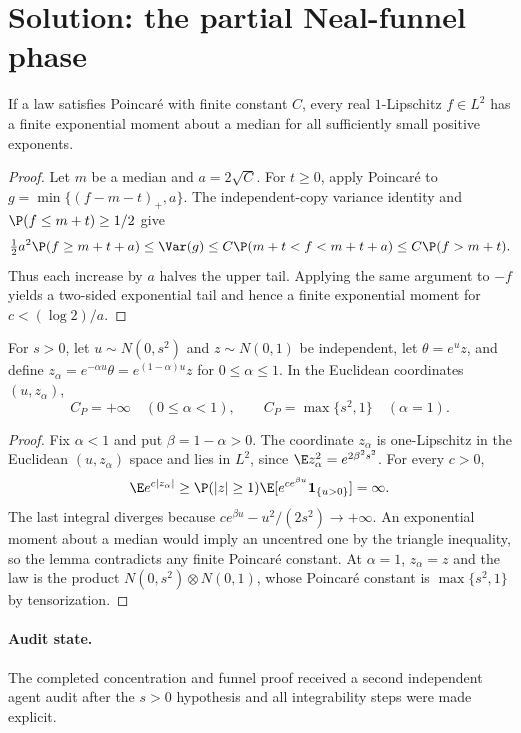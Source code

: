 \documentclass[../main.tex]{subfiles}
\begin{document}

\section*{Solution: the partial Neal-funnel phase}

\begin{lemma}
If a law satisfies Poincar\'e with finite constant $C$, every real $1$-Lipschitz $f\in L^2$
has a finite exponential moment about a median for all sufficiently small positive exponents.
\end{lemma}

\begin{proof}
Let $m$ be a median and $a=2\sqrt C$. For $t\ge0$, apply Poincar\'e to
$g=\min\{(f-m-t)_+,a\}$. The independent-copy variance identity and
$\P(f\le m+t)\ge1/2$ give
\[
 \tfrac12a^2\P(f\ge m+t+a)\le\Var(g)
 \le C\P(m+t<f<m+t+a)\le C\P(f>m+t).
\]
Thus each increase by $a$ halves the upper tail. Applying the same argument to $-f$ yields a
two-sided exponential tail and hence a finite exponential moment for
$c<(\log2)/a$.
\end{proof}

\begin{proposition}
For $s>0$, let $u\sim N(0,s^2)$ and $z\sim N(0,1)$ be independent, let $\theta=e^uz$, and define
$z_\alpha=e^{-\alpha u}\theta=e^{(1-\alpha)u}z$ for $0\le\alpha\le1$. In the Euclidean
coordinates $(u,z_\alpha)$,
\[
 C_P=+\infty\quad(0\le\alpha<1),\qquad
 C_P=\max\{s^2,1\}\quad(\alpha=1).
\]
\end{proposition}

\begin{proof}
Fix $\alpha<1$ and put $\beta=1-\alpha>0$. The coordinate $z_\alpha$ is one-Lipschitz in the
Euclidean $(u,z_\alpha)$ space and lies in $L^2$, since
$\E z_\alpha^2=e^{2\beta^2s^2}$. For every $c>0$,
\[
\E e^{c|z_\alpha|}
 \ge\P(|z|\ge1)\E[e^{ce^{\beta u}}\mathbf1_{\{u>0\}}]=\infty.
\]
The last integral diverges because
$ce^{\beta u}-u^2/(2s^2)\to+\infty$. An exponential moment about a median would imply an
uncentred one by the triangle inequality, so the lemma contradicts any finite Poincar\'e constant.
At $\alpha=1$, $z_\alpha=z$ and the law is
the product $N(0,s^2)\otimes N(0,1)$, whose Poincar\'e constant is
$\max\{s^2,1\}$ by tensorization.
\end{proof}

\paragraph{Audit state.}
The completed concentration and funnel proof received a second independent agent audit after the
$s>0$ hypothesis and all integrability steps were made explicit.
\end{document}
